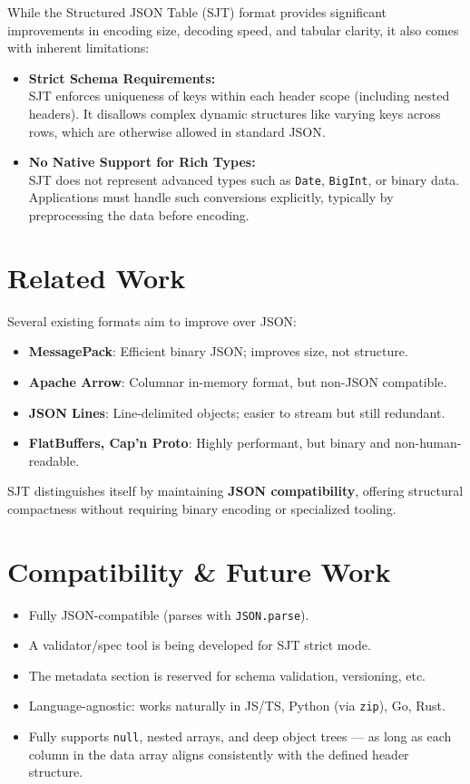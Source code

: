 \documentclass[12pt]{article}
\begin{document}
While the Structured JSON Table (SJT) format provides significant improvements in encoding size, decoding speed, and tabular clarity, it also comes with inherent limitations:

\begin{itemize}
  \item \textbf{Strict Schema Requirements:} \\
  SJT enforces uniqueness of keys within each header scope (including nested headers). It disallows complex dynamic structures like varying keys across rows, which are otherwise allowed in standard JSON.

  \item \textbf{No Native Support for Rich Types:} \\
  SJT does not represent advanced types such as \texttt{Date}, \texttt{BigInt}, or binary data. Applications must handle such conversions explicitly, typically by preprocessing the data before encoding.
\end{itemize}
\section{Related Work}
Several existing formats aim to improve over JSON:

\begin{itemize}
  \item \textbf{MessagePack}: Efficient binary JSON; improves size, not structure.
  \item \textbf{Apache Arrow}: Columnar in-memory format, but non-JSON compatible.
  \item \textbf{JSON Lines}: Line-delimited objects; easier to stream but still redundant.
  \item \textbf{FlatBuffers, Cap’n Proto}: Highly performant, but binary and non-human-readable.
\end{itemize}

SJT distinguishes itself by maintaining \textbf{JSON compatibility}, offering structural compactness without requiring binary encoding or specialized tooling.

\section{Compatibility \& Future Work}
\begin{itemize}
  \item Fully JSON-compatible (parses with \texttt{JSON.parse}).
  \item A validator/spec tool is being developed for SJT strict mode.
  \item The metadata section is reserved for schema validation, versioning, etc.
  \item Language-agnostic: works naturally in JS/TS, Python (via \texttt{zip}), Go, Rust.
  \item Fully supports \texttt{null}, nested arrays, and deep object trees --- as long as each column in the data array aligns consistently with the defined header structure.
\end{itemize}
\end{document}
